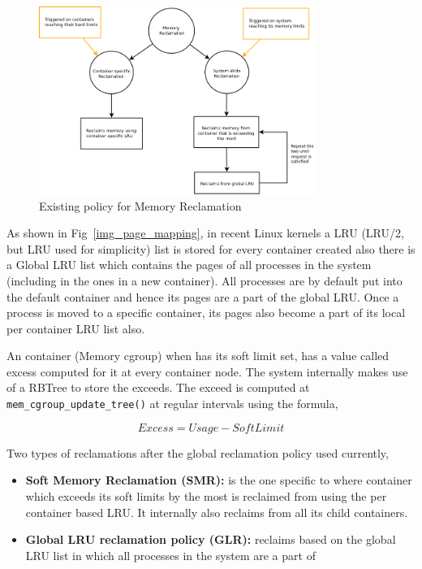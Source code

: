       \begin{figure}
	\centering
	\includegraphics[width=0.8\textwidth]{images/background/high_level_Reclamation.png}
	\caption{Existing policy for Memory Reclamation}
	\label{img_high_level}
      \end{figure}  
      
      As shown in Fig~\ref{img_page_mapping}, in recent Linux kernels a LRU (LRU/2, but LRU used for simplicity) list is stored for every 
container created also there is a Global LRU list which contains the pages of all processes in the system (including in the ones in a new 
container). All processes are by default put into the default container and hence its pages are a part of the global LRU.  Once a process is 
moved to a specific container, its pages also become a part of its local per container LRU list also.
    
      An container (Memory cgroup) when has its soft limit set, has a value called excess computed for it at every container node. The 
system internally makes use of a RBTree to store the exceeds. The exceed is computed at \texttt{mem\_cgroup\_update\_tree()} at regular 
intervals using the formula,
      
	  \begin{center}
	    \begin{equation}
	      Excess = Usage - SoftLimit
	    \end{equation}
	  \end{center}
      
      \pagebreak
      
      \noindent Two types of reclamations after the global reclamation policy used currently, 
      
      \begin{itemize}
       \item \textbf{Soft Memory Reclamation (SMR):} is the one specific to \cg{} where container which exceeds its 
soft limits by the most is reclaimed from using the per container based LRU. It internally also reclaims from all its child containers.  
       \item \textbf{Global LRU reclamation policy (GLR):} reclaims based on the global LRU list in which all processes in the system are a 
part of
      \end{itemize}     
      
